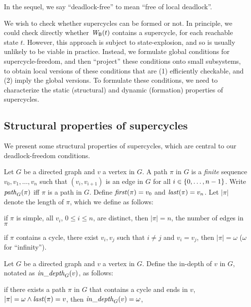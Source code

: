 In the sequel, we say ``deadlock-free'' to mean ``free of local deadlock''.



We wish to check whether supercycles can be formed or not.
In principle, we could check directly whether $\mathit{W}_{\mathsf{B}}({t})$ contains a supercycle, for each
reachable state $t$. However, this approach is subject to state-explosion, and so is usually
unlikely to be viable in practice.  Instead, we formulate global conditions for supercycle-freedom,
and then ``project'' these conditions onto small subsystems, to obtain local versions of these
conditions that are (1) efficiently checkable, and (2) imply the global versions.
To formulate these conditions, we need to characterize the static (structural) and dynamic
(formation) properties of supercycles.



\subsection{Structural properties of supercycles}
\label{secn:supercycle-structural}

We present some structural properties of supercycles, which
are central to our deadlock-freedom conditions.


 \label{def:path} \label{defn:path}
Let $G$ be a directed graph and $v$ a vertex in $G$. A path $\pi$ in $G$ is a \emph{finite} sequence
$v_0, v_1, \ldots,v_n$ such that $(v_i, v_{i+1})$ is an edge in $G$ for all $i \in \{ 0,\ldots,n-1 \}$.
Write $\mathit{path}_{G}(\pi)$ iff $\pi$ is a path in $G$.
Define $\mathit{first}(\pi) = v_0$ and $\mathit{last}(\pi) = v_n$. 
%
Let $|\pi|$ denote the length of $\pi$, which we define as follows:
\be
\item if $\pi$ is simple, \ie all $v_i$, $0 \le i \le n$, are distinct, then $|\pi| = n$, \ie the
number of edges in $\pi$
\item if $\pi$ contains a cycle, \ie there exist $v_i, v_j$ such that $i \ne j$ and $v_i = v_j$, then
$|\pi| = \omega$ ($\omega$ for ``infinity'').
\ee

\ed

 \label{def:depth} \label{defn:depth} 
Let $G$ be a directed graph and $v$ a vertex in $G$. Define the in-depth of $v$ in $G$, notated as
$\mathit{in\_depth}_{G}({v})$, as follows:
\be
\item if there exists a path $\pi$ in $G$ that contains a cycle and ends in $v$, \ie $|\pi| = \omega
  \land \mathit{last}(\pi) = v$, then $\mathit{in\_depth}_{G}({v}) = \omega$,

